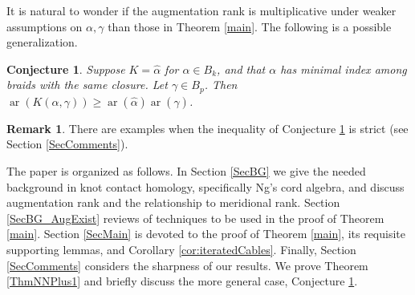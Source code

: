 \documentclass[11pt]{amsart}
\def\s{{\sigma}}
\def\ar{\operatorname{ar}}
\def\fp{{\scriptstyle \bar{\bar{p}}}}
\newtheorem{conj}[thm]{Conjecture}
\theoremstyle{definition}
\newtheorem{rem}[thm]{Remark}
\begin{document}
It is natural to wonder if the augmentation rank is multiplicative under weaker assumptions on $\alpha, \gamma$ than those in Theorem \ref{main}. The following is a possible generalization.

\begin{conj}Suppose $K=\hat{\alpha}$ for $\alpha\in B_k$, and that $\alpha$ has minimal index among braids with the same closure. Let $\gamma\in B_p$. Then $\ar(K(\alpha,\gamma)) \ge \ar(\hat{\alpha})\ar(\hat{\gamma})$.
\label{ConjSuperMultipl}
\end{conj}

\begin{rem}There are examples when the inequality of Conjecture \ref{ConjSuperMultipl} is strict (see Section \ref{SecComments}).
\label{RemStrictlySuper}
\end{rem}




The paper is organized as follows. In Section \ref{SecBG} we give the needed background in knot contact homology, specifically Ng's cord algebra, and discuss augmentation rank and the relationship to meridional rank. Section \ref{SecBG_AugExist} reviews of techniques to be used in the proof of Theorem \ref{main}. Section \ref{SecMain} is devoted to the proof of Theorem \ref{main}, its requisite supporting lemmas, and Corollary \ref{cor:iteratedCables}. Finally, Section \ref{SecComments} considers the sharpness of our results. We prove Theorem \ref{ThmNNPlus1} and briefly discuss the more general case, Conjecture \ref{ConjSuperMultipl}.
\end{document}
